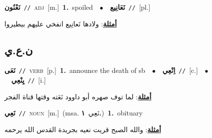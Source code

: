 \documentclass[10pt,a4paper,twoside]{article} %
\begin{document}
\begin{multicols}{2}
{\setlength\topsep{0pt}\textbf{\foreignlanguage{arabic}{نَعْنُون}}\ {\color{gray}\texttt{//}\color{black}}\ \textsc{adj}\ [m.]\ \textbf{1.}~spoiled\ \ $\bullet$\ \ \setlength\topsep{0pt}\textbf{\foreignlanguage{arabic}{نَعَانِيع}}\ {\color{gray}\texttt{//}\color{black}}\ [pl.]\  \begin{flushright}\color{gray}\foreignlanguage{arabic}{\textbf{\underline{\foreignlanguage{arabic}{أمثلة}}}: ولادها نَعانِيع انفخي عليهم بيطيروا}\end{flushright}\color{black}} \vspace{2mm}

\vspace{-3mm}
\subsection*{\color{blue}\foreignlanguage{arabic}{ن.ع.ي}\color{blue}{}} 

{\setlength\topsep{0pt}\textbf{\foreignlanguage{arabic}{نَعَى}}\ {\color{gray}\texttt{//}\color{black}}\ \textsc{verb}\ [p.]\ \textbf{1.}~announce the death of sb\ \ $\bullet$\ \ \setlength\topsep{0pt}\textbf{\foreignlanguage{arabic}{اِنْعِي}}\ {\color{gray}\texttt{//}\color{black}}\ [c.]\ \ $\bullet$\ \ \setlength\topsep{0pt}\textbf{\foreignlanguage{arabic}{يِنْعِي}}\ {\color{gray}\texttt{//}\color{black}}\ [i.]\  \begin{flushright}\color{gray}\foreignlanguage{arabic}{\textbf{\underline{\foreignlanguage{arabic}{أمثلة}}}: لما توف صهره أبو داوود نَعَته وقتها قناة الفجر}\end{flushright}\color{black}} \vspace{2mm}

{\setlength\topsep{0pt}\textbf{\foreignlanguage{arabic}{نَعِي}}\ {\color{gray}\texttt{//}\color{black}}\ \textsc{noun}\ [m.]\ \color{gray}(msa. \foreignlanguage{arabic}{نَعِي}~\foreignlanguage{arabic}{\textbf{١.}})\color{black}\ \textbf{1.}~obituary\  \begin{flushright}\color{gray}\foreignlanguage{arabic}{\textbf{\underline{\foreignlanguage{arabic}{أمثلة}}}: والله الصبح قريت نعيه بجريدة القدس الله يرحمه}\end{flushright}\color{black}} \vspace{2mm}


\end{multicols}
\end{document}

